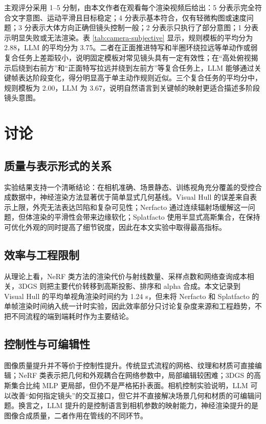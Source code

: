 \documentclass[a4paper, 12pt, centering]{article}
\begin{document}
主观评分采用 1--5 分制，由本文作者在观看每个渲染视频后给出：5 分表示完全符合文字意图、运动平滑且目标稳定；4 分表示基本符合，仅有轻微构图或速度问题；3 分表示大体方向正确但镜头控制一般；2 分表示只执行了部分意图；1 分表示明显失败或无法渲染。表 \ref{tab:camera-subjective} 显示，规则模板的平均分为 2.88，LLM 的平均分为 3.75。二者在正面推进特写和半圈环绕拉远等单动作或弱复合任务上差距较小，说明固定模板对常见镜头具有一定有效性；在“高处俯视揭示后绕到右前方”和“正面特写拉远并绕到左前方”等复合任务上，LLM 能够通过关键帧表达阶段变化，得分明显高于单主动作规则近似。三个复合任务的平均分中，规则模板为 2.00，LLM 为 3.67，说明自然语言到关键帧的映射更适合描述多阶段镜头意图。

\section{讨论}
\subsection{质量与表示形式的关系}
实验结果支持一个清晰结论：在相机准确、场景静态、训练视角充分覆盖的受控合成数据中，神经渲染方法显著优于简单显式几何基线。Visual Hull 的误差来自表示上限，外壳无法表达凹陷和复杂可见性；Nerfacto 通过连续辐射场缓解这一问题，但体渲染的平滑性会带来边缘软化；Splatfacto 使用半显式高斯集合，在保持可优化外观的同时提高了细节锐度，因此在本文实验中取得最高指标。

\subsection{效率与工程限制}
从理论上看，NeRF 类方法的渲染代价与射线数量、采样点数和网络查询成本相关，3DGS 则把主要代价转移到高斯投影、排序和 alpha 合成。本文记录到 Visual Hull 的平均单视角渲染时间约为 1.24 s，但未将 Nerfacto 和 Splatfacto 的单帧渲染时间纳入统一计时实验，因此效率部分只讨论复杂度来源和工程趋势，不把不同流程的端到端耗时作为主要结论。

\subsection{控制性与可编辑性}
图像质量提升并不等价于控制性提升。传统显式流程的网格、纹理和材质可直接编辑；NeRF 类表示把几何和外观耦合在网络参数中，局部编辑较困难；3DGS 的高斯集合比纯 MLP 更局部，但仍不是严格拓扑表面。相机控制实验说明，LLM 可以改善“如何指定镜头”的交互接口，但它并不直接解决场景几何和材质的可编辑问题。换言之，LLM 提升的是控制语言到相机参数的映射能力，神经渲染提升的是图像合成质量，二者作用在管线的不同环节。
\end{document}
